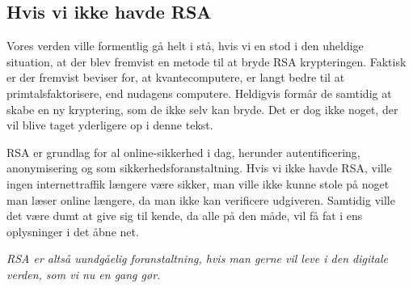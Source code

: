 \subsection{Hvis vi ikke havde RSA}
Vores verden ville formentlig gå helt i stå, hvis vi en stod i den uheldige situation, at der blev fremvist en metode til at bryde RSA krypteringen.
Faktisk er der fremvist beviser for, at kvantecomputere, er langt bedre til at primtalsfaktorisere, end nudagens computere.\cite{quantum}
Heldigvis formår de samtidig at skabe en ny kryptering, som de ikke selv kan bryde. Det er dog ikke noget, der vil blive taget yderligere op i denne tekst.

RSA er grundlag for al online-sikkerhed i dag, herunder autentificering, anonymisering og som sikkerhedsforanstaltning.
Hvis vi ikke havde RSA, ville ingen internettraffik længere være sikker, man ville ikke kunne stole på noget man læser online længere, da man ikke kan verificere udgiveren.
Samtidig ville det være dumt at give sig til kende, da alle på den måde, vil få fat i ens oplysninger i det åbne net.

\emph{RSA er altså uundgåelig foranstaltning, hvis man gerne vil leve i den digitale verden, som vi nu en gang gør.}
